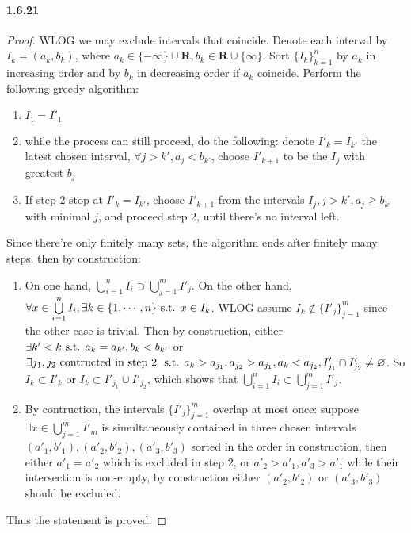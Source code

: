 \documentclass{article}
\begin{document}
\paragraph{1.6.21}
\begin{proof}
WLOG we may exclude intervals that coincide. Denote each interval by $I_k=(a_k,b_k)$, where $a_k\in \{-\infty\}\cup\mathbf{R},b_k\in\mathbf{R}\cup\{\infty\}$. Sort $\{I_k\}_{k=1}^n$ by $a_k$ in increasing order and by $b_k$ in decreasing order if $a_k$ coincide. Perform the following greedy algorithm:
\begin{enumerate}
\item $I_1=I'_1$
\item while the process can still proceed, do the following: denote $I'_k=I_{k'}$ the latest chosen interval, $\forall j>k', a_j< b_{k'}$, choose $I'_{k+1}$ to be the $I_j$ with greatest $b_j$
\item If step 2 stop at $I'_k=I_{k'}$, choose $I'_{k+1}$ from the intervals $I_j,j>k', a_j\geq b_{k'}$ with minimal $j$, and proceed step 2, until there's no interval left.
\end{enumerate}
Since there're only finitely many sets, the algorithm ends after finitely many steps. then by construction:
\begin{enumerate}
\item On one hand, $\bigcup\limits_{i=1}^n I_i\supset \bigcup\limits_{j=1}^m I'_j$. On the other hand, $\forall x\in \bigcup\limits_{i=1}^n I_i, \exists k\in \{1,\cdots, n\}\text{ s.t. } x\in I_k$. WLOG assume $I_k\not\in\{I'_j\}_{j=1}^m$ since the other case is trivial. Then by construction, either $\exists k'<k\text{ s.t. } a_k=a_{k'}, b_k<b_{k'}$ or $\exists j_1,j_2 \text{ contructed in step 2 }\text{ s.t. } a_k>a_{j_1}, a_{j_2}>a_{j_1}, a_k<a_{j_2}, I'_{j_1}\cap I'_{j_2}\neq \varnothing$. So $I_k\subset I'_{k}$ or $I_k\subset I'_{j_1}\cup I'_{j_2}$, which shows that $\bigcup\limits_{i=1}^n I_i\subset \bigcup\limits_{j=1}^m I'_j$.

\item By contruction, the intervals $\{I'_j\}_{j=1}^m$ overlap at most once: suppose $\exists x\in \bigcup\limits_{j=1}^m I'_m$ is simultaneously contained in three chosen intervals $(a'_1,b'_1),(a'_2,b'_2),(a'_3,b'_3)$ sorted in the order in construction, then either $a'_1=a'_2$ which is excluded in step 2, or $a'_2>a'_1,a'_3>a'_1$ while their intersection is non-empty, by construction either $(a'_2,b'_2)$ or $(a'_3,b'_3)$ should be excluded.
\end{enumerate}
Thus the statement is proved.
\end{proof}
\end{document}
